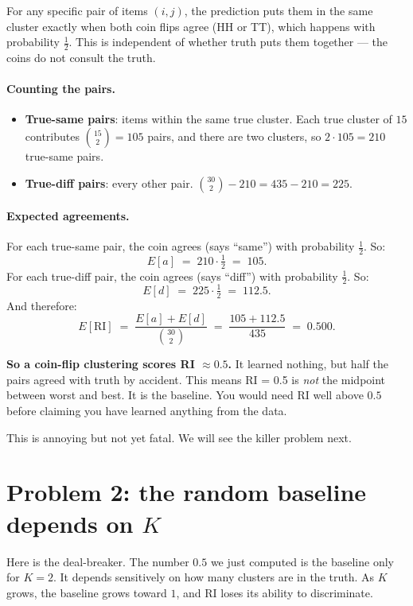 \documentclass[11pt]{article}
\begin{document}
For any specific pair of items $(i, j)$, the prediction puts them in the
same cluster exactly when both coin flips agree (HH or TT), which happens
with probability $\tfrac{1}{2}$. This is independent of whether truth puts
them together --- the coins do not consult the truth.

\paragraph{Counting the pairs.}
\begin{itemize}\setlength\itemsep{1pt}
  \item \textbf{True-same pairs}: items within the same true cluster.
        Each true cluster of $15$ contributes $\binom{15}{2} = 105$ pairs,
        and there are two clusters, so $2 \cdot 105 = 210$ true-same pairs.
  \item \textbf{True-diff pairs}: every other pair.
        $\binom{30}{2} - 210 = 435 - 210 = 225$.
\end{itemize}

\paragraph{Expected agreements.}
For each true-same pair, the coin agrees (says ``same'') with probability
$\tfrac{1}{2}$. So:
\[
  E[a] \;=\; 210 \cdot \tfrac{1}{2} \;=\; 105.
\]
For each true-diff pair, the coin agrees (says ``diff'') with probability
$\tfrac{1}{2}$. So:
\[
  E[d] \;=\; 225 \cdot \tfrac{1}{2} \;=\; 112.5.
\]
And therefore:
\[
  E[\text{RI}] \;=\; \frac{E[a] + E[d]}{\binom{30}{2}}
  \;=\; \frac{105 + 112.5}{435} \;=\; 0.500.
\]

\medskip
\noindent
\textbf{So a coin-flip clustering scores RI $\approx 0.5$.} It learned
nothing, but half the pairs agreed with truth by accident. This means
RI = 0.5 is \emph{not} the midpoint between worst and best. It is the
baseline. You would need RI well above $0.5$ before claiming you have
learned anything from the data.

This is annoying but not yet fatal. We will see the killer problem next.

\section{Problem 2: the random baseline depends on $K$}
\label{sec:problem2}

Here is the deal-breaker. The number $0.5$ we just computed is the
baseline only for $K = 2$. It depends sensitively on how many clusters are
in the truth. As $K$ grows, the baseline grows toward $1$, and RI loses
its ability to discriminate.
\end{document}

